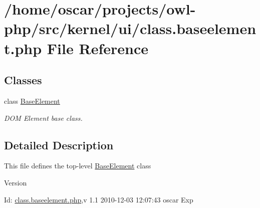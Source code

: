 \section{/home/oscar/projects/owl-\/php/src/kernel/ui/class.baseelement.php File Reference}
\label{class_8baseelement_8php}
\subsection*{Classes}
\begin{DoxyCompactItemize}
\item 
class \hyperlink{classBaseElement}{BaseElement}
\begin{DoxyCompactList}\small\item\em DOM Element base class. \item\end{DoxyCompactList}\end{DoxyCompactItemize}


\subsection{Detailed Description}
This file defines the top-\/level \hyperlink{classBaseElement}{BaseElement} class \begin{DoxyVersion}{Version}

\end{DoxyVersion}
\begin{DoxyParagraph}{Id:}
\hyperlink{class_8baseelement_8php}{class.baseelement.php},v 1.1 2010-\/12-\/03 12:07:43 oscar Exp 
\end{DoxyParagraph}
